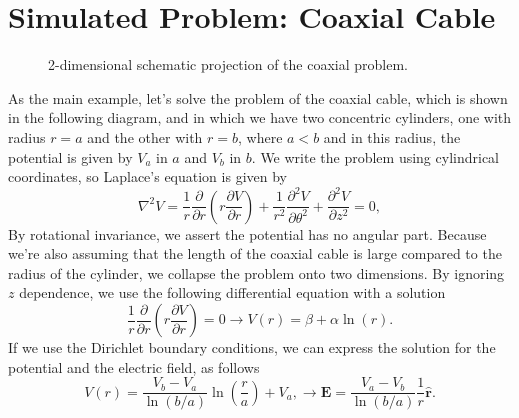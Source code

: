 \documentclass{PoS}
\begin{document}
\section{Simulated Problem: Coaxial Cable}

\begin{figure}
\centering
{}
\caption{2-dimensional schematic projection of the coaxial problem.}
\end{figure}
As the main example, let's solve the problem of the coaxial cable, which is shown in the following diagram, and in which we have two concentric cylinders, one with radius $r=a$ and the other with $r=b$, where $a<b$ and in this radius, the potential is given by $V_a$ in $a$ and $V_b$ in $b$. 
We write the problem using cylindrical coordinates, so Laplace's equation is given by 
\begin{equation}
    \nabla^2 V = \frac{1}{r}\frac{\partial}{\partial r}\left(r\frac{\partial V}{\partial r}\right) + \frac{1}{r^2}\frac{\partial^2 V}{\partial \theta^2} + \frac{\partial^2 V}{\partial z^2} = 0,
\end{equation}
By rotational invariance, we assert the potential has no angular part. Because we're also assuming that the length of the coaxial cable is large compared to the radius of the cylinder, we collapse the problem onto two dimensions. By ignoring $z$ dependence, we use the following differential equation with a solution
\begin{equation}
    \frac{1}{r}\frac{\partial}{\partial r}\left(r\frac{\partial V}{\partial r}\right)=0 \rightarrow V(r) = \beta + \alpha\ln\left(r\right).
\end{equation}
If we use the Dirichlet boundary conditions, we can express the solution for the potential and the electric field, as follows 
\begin{equation}
    V(r) = \frac{V_b - V_a}{\ln(b/a)}\ln\left(\frac{r}{a}\right) + V_a, \rightarrow \mathbf{E} = \frac{V_a - V_b}{\ln(b/a)}\frac{1}{r}\hat{\mathbf{r}}.
    \label{eq:coax_pot}
\end{equation}
\end{document}
